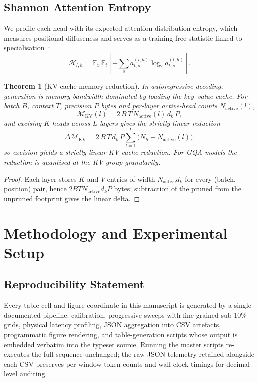 \documentclass[11pt]{article}
\newtheorem{theorem}{Theorem}
\newcommand{\ekv}{\mathcal{M}_{\mathrm{KV}}}
\begin{document}
\subsection{Shannon Attention Entropy}
We profile each head with its expected attention distribution entropy, which
measures positional diffuseness and serves as a training-free statistic linked to
specialisation~\cite{voita2019analyzing}:
\begin{equation}
\overline{\mathcal{H}}_{l,h}=\mathbb{E}_{x}\,\mathbb{E}_{t}\left[-\sum_{s}a^{(l,h)}_{t,s}\log_{2}a^{(l,h)}_{t,s}\right].
\label{eq:entropy}
\end{equation}

\begin{theorem}[KV-cache memory reduction]
\label{thm:kv}
In autoregressive decoding, generation is memory-bandwidth dominated by loading
the key--value cache. For batch $B$, context $T$, precision $P$ bytes and
per-layer active-head counts $N_{\text{active}}(l)$,
\begin{equation}
\ekv(l)=2\,B\,T\,N_{\text{active}}(l)\,d_k\,P,
\label{eq:kv}
\end{equation}
and excising $K$ heads across $L$ layers gives the strictly linear reduction
\begin{equation}
\Delta\ekv=2\,B\,T\,d_k\,P\!\sum_{l=1}^{L}\!\big(N_h-N_{\text{active}}(l)\big).
\label{eq:kvdelta}
\end{equation}
so excision yields a strictly linear KV-cache reduction. For GQA models the
reduction is quantised at the KV-group granularity.
\end{theorem}
\begin{proof}
Each layer stores $K$ and $V$ entries of width $N_{\text{active}}d_k$ for every
(batch, position) pair, hence $2BTN_{\text{active}}d_kP$ bytes; subtraction of the
pruned from the unpruned footprint gives the linear delta.
\end{proof}

\section{Methodology and Experimental Setup}
\subsection{Reproducibility Statement}
Every table cell and figure coordinate in this manuscript is generated by a
single documented pipeline: calibration, progressive sweeps with fine-grained
sub-10\% grids, physical latency profiling, JSON aggregation into CSV artefacts,
programmatic figure rendering, and table-generation scripts whose output is
embedded verbatim into the typeset source. Running the master scripts
re-executes the full sequence unchanged; the raw JSON telemetry retained
alongside each CSV preserves per-window token counts and wall-clock timings for
decimal-level auditing.
\end{document}
